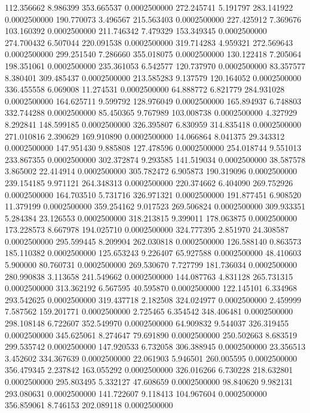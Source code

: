 112.356662 8.986399 353.665537 0.0002500000
272.245741 5.191797 283.141922 0.0002500000
190.770073 3.496567 215.563403 0.0002500000
227.425912 7.369676 103.160392 0.0002500000
211.746342 7.479329 153.349345 0.0002500000
274.700432 6.507044 220.091538 0.0002500000
319.714283 4.959321 272.569643 0.0002500000
299.251540 7.286660 355.018075 0.0002500000
130.122418 7.205064 198.351061 0.0002500000
235.361053 6.542577 120.737970 0.0002500000
83.357577 8.380401 309.485437 0.0002500000
213.585283 9.137579 120.164052 0.0002500000
336.455558 6.069008 11.274531 0.0002500000
64.888772 6.821779 284.931028 0.0002500000
164.625711 9.599792 128.976049 0.0002500000
165.894937 6.748803 332.744288 0.0002500000
85.450365 9.767989 103.008738 0.0002500000
4.327929 8.292841 148.599185 0.0002500000
326.395807 6.830959 314.835418 0.0002500000
271.010816 2.390629 169.910890 0.0002500000
14.066864 8.041375 29.343312 0.0002500000
147.951430 9.885808 127.478596 0.0002500000
254.018744 9.551013 233.867355 0.0002500000
302.372874 9.293585 141.519034 0.0002500000
38.587578 3.865002 22.414914 0.0002500000
305.782472 6.905873 190.319096 0.0002500000
239.154185 9.971121 264.348313 0.0002500000
220.374662 6.404090 269.752926 0.0002500000
164.703510 5.731716 326.971321 0.0002500000
191.877451 6.908520 11.379199 0.0002500000
359.254162 9.017523 269.506824 0.0002500000
309.933351 5.284384 23.126553 0.0002500000
318.213815 9.399011 178.063875 0.0002500000
173.228573 8.667978 194.025710 0.0002500000
324.777395 2.851970 24.308587 0.0002500000
295.599445 8.209904 262.030818 0.0002500000
126.588140 0.863573 185.110382 0.0002500000
125.653243 9.226407 65.927588 0.0002500000
48.410603 5.900000 80.760731 0.0002500000
269.530670 7.727799 181.736034 0.0002500000
280.990838 3.113658 241.549662 0.0002500000
144.087763 4.831128 265.731315 0.0002500000
313.362192 6.567595 40.595870 0.0002500000
122.145101 6.334968 293.542625 0.0002500000
319.437718 2.182508 324.024977 0.0002500000
2.459999 7.587562 159.201771 0.0002500000
2.725465 6.354542 348.406481 0.0002500000
298.108148 6.722607 352.549970 0.0002500000
64.909832 9.544037 326.319455 0.0002500000
345.625061 8.274647 79.691890 0.0002500000
250.502663 8.683519 299.535742 0.0002500000
147.920533 6.732058 306.388945 0.0002500000
23.356513 3.452602 334.367639 0.0002500000
22.061903 5.946501 260.005595 0.0002500000
356.479345 2.237842 163.055292 0.0002500000
326.016266 6.730228 218.632801 0.0002500000
295.803495 5.332127 47.608659 0.0002500000
98.840620 9.982131 293.080631 0.0002500000
141.722607 9.118413 104.967604 0.0002500000
356.859061 8.746153 202.089118 0.0002500000
